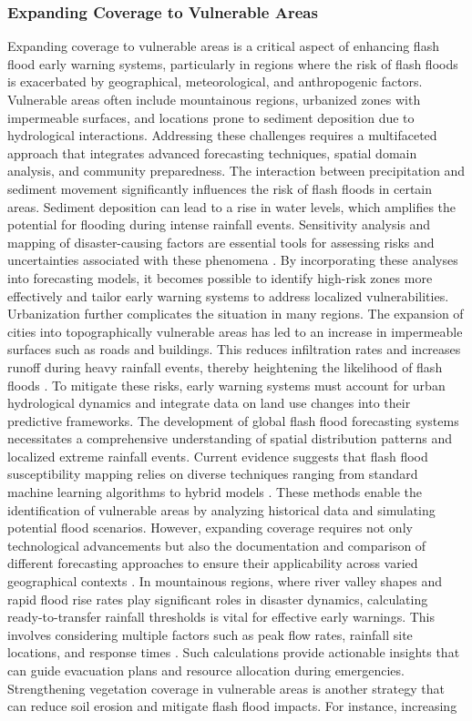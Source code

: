 \subsubsection{Expanding Coverage to Vulnerable Areas}
Expanding coverage to vulnerable areas is a critical aspect of enhancing flash flood early warning systems, particularly in regions where the risk of flash floods is exacerbated by geographical, meteorological, and anthropogenic factors. Vulnerable areas often include mountainous regions, urbanized zones with impermeable surfaces, and locations prone to sediment deposition due to hydrological interactions. Addressing these challenges requires a multifaceted approach that integrates advanced forecasting techniques, spatial domain analysis, and community preparedness. The interaction between precipitation and sediment movement significantly influences the risk of flash floods in certain areas. Sediment deposition can lead to a rise in water levels, which amplifies the potential for flooding during intense rainfall events. Sensitivity analysis and mapping of disaster-causing factors are essential tools for assessing risks and uncertainties associated with these phenomena \citep{Yang2022}. By incorporating these analyses into forecasting models, it becomes possible to identify high-risk zones more effectively and tailor early warning systems to address localized vulnerabilities. Urbanization further complicates the situation in many regions. The expansion of cities into topographically vulnerable areas has led to an increase in impermeable surfaces such as roads and buildings. This reduces infiltration rates and increases runoff during heavy rainfall events, thereby heightening the likelihood of flash floods \citep{Pham2020}. To mitigate these risks, early warning systems must account for urban hydrological dynamics and integrate data on land use changes into their predictive frameworks. The development of global flash flood forecasting systems necessitates a comprehensive understanding of spatial distribution patterns and localized extreme rainfall events. Current evidence suggests that flash flood susceptibility mapping relies on diverse techniques ranging from standard machine learning algorithms to hybrid models \citep{Hinge2024}. These methods enable the identification of vulnerable areas by analyzing historical data and simulating potential flood scenarios. However, expanding coverage requires not only technological advancements but also the documentation and comparison of different forecasting approaches to ensure their applicability across varied geographical contexts \citep{Zanchetta2020}. In mountainous regions, where river valley shapes and rapid flood rise rates play significant roles in disaster dynamics, calculating ready-to-transfer rainfall thresholds is vital for effective early warnings. This involves considering multiple factors such as peak flow rates, rainfall site locations, and response times \citep{Yuan2019}. Such calculations provide actionable insights that can guide evacuation plans and resource allocation during emergencies. Strengthening vegetation coverage in vulnerable areas is another strategy that can reduce soil erosion and mitigate flash flood impacts. For instance, increasing 